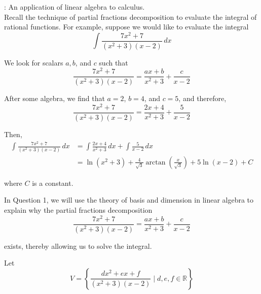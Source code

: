 \documentclass[10pt]{article}
\newcommand{\noin}{\noindent}
\begin{document}
\vspace{0.2in}
{\large 
{} 

\vspace{0.2in}


}

\vfill


\pagebreak


\noin {\bf Preamble}: An application of linear algebra to calculus. \\

\noin Recall the technique of partial fractions decomposition to evaluate the integral of rational functions.  For example, suppose we would like to evaluate the integral
$$\int \frac{7x^2+7}{(x^2+3)(x-2)} \, dx$$

\noin We look for scalars $a, b$, and $c$ such that
$$\frac{7x^2+7}{(x^2+3)(x-2)}  = \frac{ax+b}{x^2+3}+\frac{c}{x-2}$$

\noin After some algebra, we find that $a=2$, $b=4$, and $c=5$, and therefore,
$$\frac{7x^2+7}{(x^2+3)(x-2)}  = \frac{2x+4}{x^2+3}+\frac{5}{x-2}$$

\noin Then, 
\begin{align*}
\int \frac{7x^2+7}{(x^2+3)(x-2)} \, dx &= \int \frac{2x+4}{x^2+3}\, dx + \int \frac{5}{x-2}\, dx \\
&=\ln (x^2+3)+\frac{4}{\sqrt 3} \arctan \left (  \frac{x}{\sqrt 3}\right ) +5\ln(x-2) +C
\end{align*}

\noin where $C$ is a constant.

\vspace{20pt}

\noin In Question 1, we will use the theory of basis and dimension in linear algebra to explain why the partial fractions decomposition 
$$\frac{7x^2+7}{(x^2+3)(x-2)}  = \frac{ax+b}{x^2+3}+\frac{c}{x-2}$$

\noin exists, thereby allowing us to solve the integral.


\vspace{90pt}

\noin{\bf 1.}  Let $$V = \left \{ \frac{dx^2+ex+f}{(x^2+3)(x-2)} \mid d, e, f\in \mathbb R\right \}$$  
\end{document}
